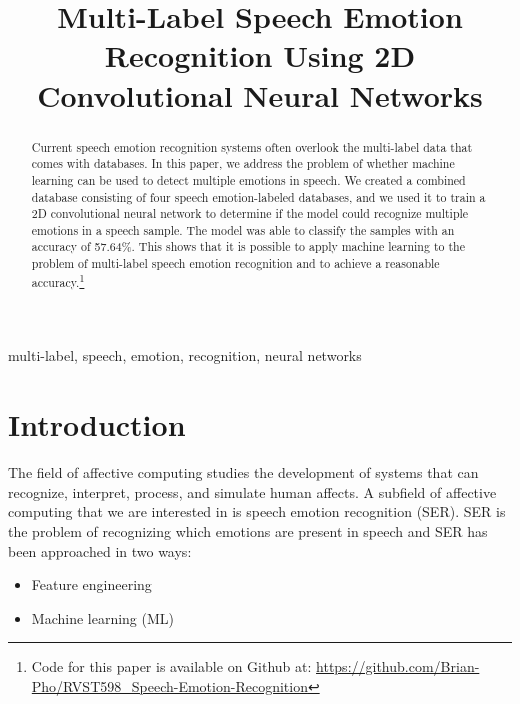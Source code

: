 \documentclass[conference]{IEEEtran}
\begin{document}
\title{Multi-Label Speech Emotion Recognition Using 2D Convolutional Neural Networks}

\author{
}

\maketitle

\begin{abstract}
Current speech emotion recognition systems often overlook the multi-label data that comes with databases. In this paper, we address the problem of whether machine learning can be used to detect multiple emotions in speech. We created a combined database consisting of four speech emotion-labeled databases, and we used it to train a 2D convolutional neural network to determine if the model could recognize multiple emotions in a speech sample. The model was able to classify the samples with an accuracy of 57.64\%. This shows that it is possible to apply machine learning to the problem of multi-label speech emotion recognition and to achieve a reasonable accuracy.\footnote{Code for this paper is available on Github at: \url{https://github.com/Brian-Pho/RVST598_Speech-Emotion-Recognition}}
\end{abstract}

\begin{IEEEkeywords}
multi-label, speech, emotion, recognition, neural networks
\end{IEEEkeywords}

\section{Introduction}
The field of affective computing studies the development of systems that can recognize, interpret, process, and simulate human affects. A subfield of affective computing that we are interested in is speech emotion recognition (SER). SER is the problem of recognizing which emotions are present in speech and SER has been approached in two ways:
\begin{itemize}
	\item Feature engineering
	\item Machine learning (ML)
\end{itemize}
\end{document}
